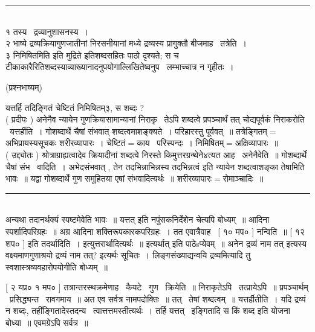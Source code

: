 \documentclass[11pt, openany]{book}
\begin{document}
\begin{multicols}{2}
\noindent
\rule{1\linewidth}{0.5pt}\\

१ तस्य \textendash\ द्रव्यानुशासनस्य~।\\ 

२ भाष्ये द्रव्यक्रियागुणजातीनां निरसनीयानां मध्ये द्रव्यस्य प्रागुक्तौ बीजमाह \textendash\ तत्रेति~।\\

३ {\qt निमिषितमिति} इति मुद्रिते इतिशब्दसहितः पाठो दृश्यते; स च टीकाकारैरितिशब्दस्याव्याख्यानादनुपयोगाल्लिखितेष्वनुप \textendash\ लम्भाच्चात्र न गृहीतः~।

\columnbreak

\begin{center}
(प्रश्नभाष्यम्)
\end{center}

{\qt यत्तर्हि तदिङ्गितं चेष्टितं निमिषितम्३, स शब्दः ?}\\

( प्रदीपः ) अनेनैव न्यायेन गुणक्रियासामान्यानां निराकृ \textendash\ तेऽपि शब्दत्वे प्रपञ्चार्थं तत् चोद्यपूर्वकं निराकरोति \textendash\ यत्तर्हीति~।  गोशब्दार्थे चैषां संभवात् शब्दत्वमाशङ्क्यते~। परिहारस्तु पूर्ववत्~॥ तत्रेङ्गितम्$=$अभिप्रायस्यसूचकः शरीरव्यापारः~। चेष्टितं$=$काय \textendash\ परिस्पन्दः~। निमिषितम्$=$अक्षिव्यापारः~॥\\

( उद्द्योतः ) श्रोत्राग्राह्यत्वादेव क्रियादीनां शब्दत्वे निरस्ते किमुत्तरग्रन्थेने४त्यत आह \textendash\ अनेनैवेति~॥ गोशब्दार्थे चैषां संभ \textendash\ वादिति~।  अभेदसंभवात् , तेन {\qt तदभिन्नाभिन्नस्य तदभिन्नत्वं} इति न्यायेन शब्दत्वाशङ्का तेषामिति भावः~॥ यद्वा गोशब्दार्थे गुण समूहितया एषां संभवादित्यर्थः~॥ शरीरव्यापारः$=$रोमाञ्चादिः~॥\\

\noindent
\rule{1\linewidth}{0.5pt}\\

\noindent
अन्यथा तदानर्थक्यं स्पष्टमेवेति भावः~॥ {\qt यत्तत्} इति नपुंसकनिर्देशेन चेत्यपि बोध्यम्~॥ आदिना स्पर्शादिपरिग्रहः~॥ अग्र आदिना शक्तिरूपकारकपरिग्रहः~। तत एवात्रैवाह \textendash\ [ १० मप० ] नन्विति~॥ [ १२ शप० ] इति तदर्थादिति~। इत्युत्तरार्थादित्यर्थः~॥ {\qt इत्यर्थात्} इति पाठेsप्येवम्~॥ अनेन {\qt द्रव्यं नाम} तत् इत्यस्य {\qt वक्ष्यमाणगुणाश्रयो द्रव्यं नाम तत्?} इत्यर्थः सूचितः~। लिङ्गसंख्याद्यन्वयि द्रव्यमित्यादि तु स्वशास्त्रव्यवहारोपयोगीति बोध्यम्~॥

[ २ यप्र० १ मप० ] तत्रान्तरस्थक्रमेणाह \textendash\ कैयटे \textendash\ गुण \textendash\ क्रियेति~॥ निराकृतेऽपि \textendash\ तत्प्रायेऽपि~॥ प्रपञ्चार्थम् \textendash\ प्रसिद्ध्यन्त \textendash\ रावगमाय~॥ अत एव सर्वत्र नामपदोक्तिः~॥ तत् \textendash\ तेषां शब्दत्वम्~॥ यत्तर्हीतीति~। यदि द्रव्यं न शब्दः, तहींङ्गितादेस्तदन्य \textendash\  त्वात्तत्तमस्तीत्यर्थः~। तर्हि यत्तत् \textendash\ इङ्गितादि स किं शब्द इति योजना बोध्या~॥ एवमग्रेऽपि सर्वत्र~॥\\


\end{multicols}
\end{document}

